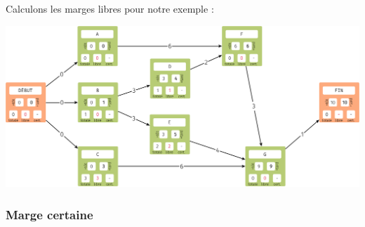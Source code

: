 Calculons les marges libres pour notre exemple :

\begin{center}
    \includegraphics[width=\linewidth]{graphes2/img/exemple_mpm5.png}
\end{center}


\subsubsection*{Marge certaine}

